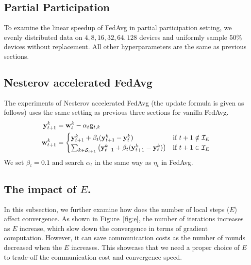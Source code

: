 \subsection{Partial Participation}
To examine the linear speedup of FedAvg in partial participation setting,
we evenly distributed data on $4, 8, 16, 32, 64, 128$ devices and 
uniformly sample $50\%$ devices without replacement. 
All other hyperparameters are the same as previous sections. 

\subsection{Nesterov accelerated FedAvg}
The experiments of Nesterov accelerated FedAvg (the update formula is given as follows) uses the same setting as
previous three sections for vanilla FedAvg.
\begin{align*}
{\mathbf{y}}_{t+1}^{k} & ={\mathbf{w}}_{t}^{k}-\alpha_{t}{\mathbf{g}}_{t,k}\\
{\mathbf{w}}_{t+1}^{k} & =\begin{cases}
{\mathbf{y}}_{t+1}^{k}+\beta_{t}({\mathbf{y}}_{t+1}^{k}-{\mathbf{y}}_{t}^{k}) & \text{if }t+1\notin\mathcal{I}_{E}\\
\sum_{k\in\mathcal{S}_{t+1}}\left({\mathbf{y}}_{t+1}^{k}+\beta_{t}({\mathbf{y}}_{t+1}^{k}-{\mathbf{y}}_{t}^{k})\right) & \text{if }t+1\in\mathcal{I}_{E}
\end{cases}
\end{align*}
We set $\beta_t = 0.1$ and search $\alpha_t$ in the same way as $\eta_t$
in FedAvg.


\subsection{The impact of $E$.}
In this subsection, we further examine how does the number of local steps ($E$) 
affect convergence. As shown in Figure~\ref{fig:e}, the number of iterations increases as $E$ increase, which slow down the convergence in
terms of gradient computation. However, it can save communication costs as
the number of rounds decreased when the $E$ increases. This showcase that
we need a proper choice of $E$ to trade-off the communication cost and
convergence speed. 








